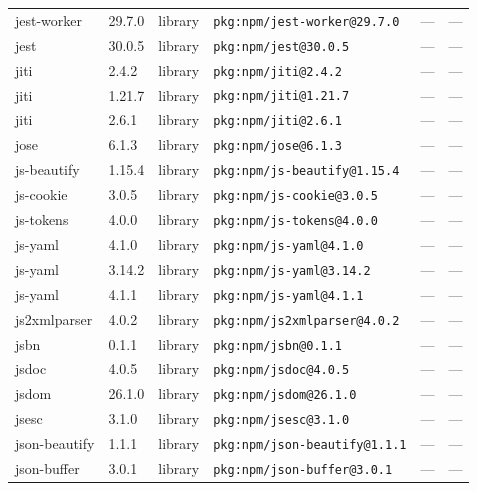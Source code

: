\documentclass[11pt,a4paper]{article}
\begin{document}
\begin{longtable}{|p{4cm}|p{2cm}|p{1.6cm}|p{5cm}|p{1.5cm}|p{3.5cm}|}
\raggedright jest-worker & 29.7.0 & library & \small\texttt{pkg:npm/jest-worker@29.7.0} & — & \small — \\
\raggedright jest & 30.0.5 & library & \small\texttt{pkg:npm/jest@30.0.5} & — & \small — \\
\raggedright jiti & 2.4.2 & library & \small\texttt{pkg:npm/jiti@2.4.2} & — & \small — \\
\raggedright jiti & 1.21.7 & library & \small\texttt{pkg:npm/jiti@1.21.7} & — & \small — \\
\raggedright jiti & 2.6.1 & library & \small\texttt{pkg:npm/jiti@2.6.1} & — & \small — \\
\raggedright jose & 6.1.3 & library & \small\texttt{pkg:npm/jose@6.1.3} & — & \small — \\
\raggedright js-beautify & 1.15.4 & library & \small\texttt{pkg:npm/js-beautify@1.15.4} & — & \small — \\
\raggedright js-cookie & 3.0.5 & library & \small\texttt{pkg:npm/js-cookie@3.0.5} & — & \small — \\
\raggedright js-tokens & 4.0.0 & library & \small\texttt{pkg:npm/js-tokens@4.0.0} & — & \small — \\
\raggedright js-yaml & 4.1.0 & library & \small\texttt{pkg:npm/js-yaml@4.1.0} & — & \small — \\
\raggedright js-yaml & 3.14.2 & library & \small\texttt{pkg:npm/js-yaml@3.14.2} & — & \small — \\
\raggedright js-yaml & 4.1.1 & library & \small\texttt{pkg:npm/js-yaml@4.1.1} & — & \small — \\
\raggedright js2xmlparser & 4.0.2 & library & \small\texttt{pkg:npm/js2xmlparser@4.0.2} & — & \small — \\
\raggedright jsbn & 0.1.1 & library & \small\texttt{pkg:npm/jsbn@0.1.1} & — & \small — \\
\raggedright jsdoc & 4.0.5 & library & \small\texttt{pkg:npm/jsdoc@4.0.5} & — & \small — \\
\raggedright jsdom & 26.1.0 & library & \small\texttt{pkg:npm/jsdom@26.1.0} & — & \small — \\
\raggedright jsesc & 3.1.0 & library & \small\texttt{pkg:npm/jsesc@3.1.0} & — & \small — \\
\raggedright json-beautify & 1.1.1 & library & \small\texttt{pkg:npm/json-beautify@1.1.1} & — & \small — \\
\raggedright json-buffer & 3.0.1 & library & \small\texttt{pkg:npm/json-buffer@3.0.1} & — & \small — \\

\end{longtable}
\end{document}
